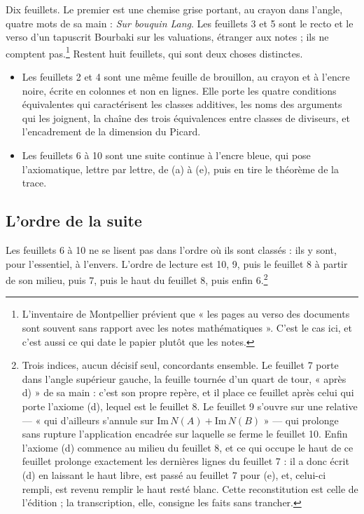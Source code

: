 \documentclass[11pt,a4paper]{article}
\begin{document}
Dix feuillets. Le premier est une chemise grise portant, au crayon dans
l'angle, quatre mots de sa main : \emph{Sur bouquin Lang}. Les feuillets 3 et 5
sont le recto et le verso d'un tapuscrit Bourbaki sur les valuations, étranger
aux notes ; ils ne comptent pas.\footnote{L'inventaire de Montpellier prévient
que « les pages au verso des documents sont souvent sans rapport avec les notes
mathématiques ». C'est le cas ici, et c'est aussi ce qui date le papier plutôt
que les notes.} Restent huit feuillets, qui sont deux choses distinctes.

\begin{itemize}
\item Les feuillets 2 et 4 sont une même feuille de brouillon, au crayon et à
  l'encre noire, écrite en colonnes et non en lignes. Elle porte les quatre
  conditions équivalentes qui caractérisent les classes additives, les noms des
  arguments qui les joignent, la chaîne des trois équivalences entre classes de
  diviseurs, et l'encadrement de la dimension du Picard.
\item Les feuillets 6 à 10 sont une suite continue à l'encre bleue, qui pose
  l'axiomatique, lettre par lettre, de (a) à (e), puis en tire le théorème de
  la trace.
\end{itemize}

\subsection*{L'ordre de la suite}

Les feuillets 6 à 10 ne se lisent pas dans l'ordre où ils sont classés : ils y
sont, pour l'essentiel, à l'envers. L'ordre de lecture est 10, 9, puis le
feuillet 8 à partir de son milieu, puis 7, puis le haut du feuillet 8, puis
enfin 6.\footnote{Trois indices, aucun décisif seul, concordants ensemble. Le
feuillet 7 porte dans l'angle supérieur gauche, la feuille tournée d'un quart
de tour, « après d) » de sa main : c'est son propre repère, et il place ce
feuillet après celui qui porte l'axiome (d), lequel est le feuillet 8. Le
feuillet 9 s'ouvre sur une relative — « qui d'ailleurs s'annule sur
$\mathrm{Im}\,N(A) + \mathrm{Im}\,N(B)$ » — qui prolonge sans rupture
l'application encadrée sur laquelle se ferme le feuillet 10. Enfin l'axiome (d)
commence au milieu du feuillet 8, et ce qui occupe le haut de ce feuillet
prolonge exactement les dernières lignes du feuillet 7 : il a donc écrit (d)
en laissant le haut libre, est passé au feuillet 7 pour (e), et, celui-ci
rempli, est revenu remplir le haut resté blanc. Cette reconstitution est celle
de l'édition ; la transcription, elle, consigne les faits sans trancher.}
\end{document}
